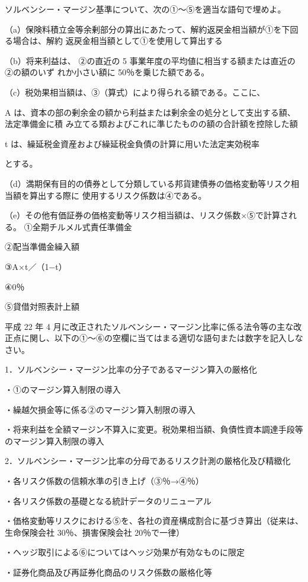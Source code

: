 \documentclass[report,gutter=10mm,fore-edge=10mm,uplatex,dvipdfmx]{jlreq}
\begin{document}
ソルベンシー・マージン基準について、次の①～⑤を適当な語句で埋めよ。

（a）保険料積立金等余剰部分の算出にあたって、解約返戻金相当額が①を下回る場合は、解約
返戻金相当額として①を使用して算出する

（b）将来利益は、 ②の直近の 5 事業年度の平均値に相当する額または直近の②の額のいず
れか小さい額に 50％を乗じた額である。

（c）税効果相当額は、③（算式）により得られる額である。ここに、

A は、資本の部の剰余金の額から利益または剰余金の処分として支出する額、法定準備金に積
み立てる類およびこれに準じたものの額の合計額を控除した額

t は、繰延税金資産および繰延税金負債の計算に用いた法定実効税率

とする。

（d）満期保有目的の債券として分類している邦貨建債券の価格変動等リスク相当額を算出する際に
使用するリスク係数は④である。

（e）その他有価証券の価格変動等リスク相当額は、リスク係数×⑤で計算される。
\answer{}
①全期チルメル式責任準備金

②配当準備金繰入額

③A×t／（1−t）

④0％

⑤貸借対照表計上額

平成 22 年 4 月に改正されたソルベンシー・マージン比率に係る法令等の主な改正点に関し、以下の①～⑥の空欄に当てはまる適切な語句または数字を記入しなさい。

1．ソルベンシー・マージン比率の分子であるマージン算入の厳格化

・①のマージン算入制限の導入

・繰越欠損金等に係る②のマージン算入制限の導入

・将来利益を全額マージン不算入に変更。税効果相当額、負債性資本調達手段等のマージン算入制限の導入

2．ソルベンシー・マージン比率の分母であるリスク計測の厳格化及び精緻化

・各リスク係数の信頼水準の引き上げ（③％→④％）

・各リスク係数の基礎となる統計データのリニューアル

・価格変動等リスクにおける⑤を、各社の資産構成割合に基づき算出（従来は、生命保険会社
30％、損害保険会社 20％で一律）

・ヘッジ取引による⑥についてはヘッジ効果が有効なものに限定

・証券化商品及び再証券化商品のリスク係数の厳格化等
\end{document}
